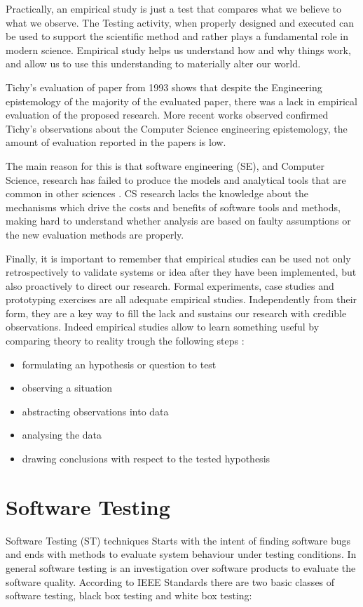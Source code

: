 Practically, an empirical study is just a test that compares what we believe to what we observe. The Testing activity, when properly designed and executed can be used to support the scientific method and rather plays a fundamental role in modern science. Empirical study helps us understand how and why things work, and allow us to use this understanding to materially alter our world.

Tichy's evaluation of paper from 1993 shows that despite the Engineering epistemology of the majority of the evaluated paper, there was a lack in empirical evaluation of the proposed research. More recent works \cite{Wainer:2009:EEC:1518331.1518552} observed confirmed Tichy's observations about the Computer Science engineering epistemology, the amount of evaluation reported in the papers is low.

The main reason for this is that software engineering (SE), and Computer Science, research has failed to produce the models and analytical tools that are common in other sciences \cite{Perry:2000:ESS:336512.336586}. CS research lacks the knowledge about the mechanisms which drive the costs and benefits of software tools and methods, making hard to understand whether analysis are  based on faulty assumptions or the new evaluation methods are properly.

Finally,  it is important to remember that empirical studies can be used not only retrospectively to validate systems or idea after they have been implemented, but also proactively to direct our research. Formal experiments, case studies and prototyping exercises are all adequate empirical studies. Independently from their form, they are a key way to fill the lack and sustains our research with credible observations. Indeed empirical studies allow to learn something useful by comparing theory to reality trough the following steps \cite{Perry:2000:ESS:336512.336586}:
\begin{itemize}
\item  formulating an hypothesis or question to test
\item  observing a situation
\item  abstracting observations into data
\item  analysing the data
\item  drawing conclusions with respect to the tested hypothesis
\end{itemize}


\section{Software Testing}
Software Testing (ST) techniques Starts with the intent of finding software bugs and ends with methods to evaluate system behaviour under testing conditions. In general software testing is an investigation over software products to evaluate the software quality. According to IEEE Standards  \cite{IEEEStd610.12-1990:glossary} there are two basic classes of software testing, black box testing and white box testing: 

